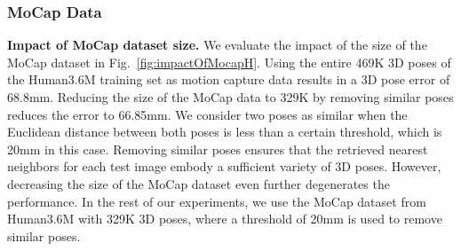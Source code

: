 \documentclass[10pt,journal,compsoc]{IEEEtran}
\begin{document}
\subsubsection*{MoCap Data}\label{sec:mocap_data}

\textbf{Impact of MoCap dataset size.}
We evaluate the impact of the size of the MoCap dataset in Fig.~\ref{fig:impactOfMocapH}. Using the entire 469K 3D poses of the 
Human3.6M training set as motion capture data results in a 3D pose error of 68.8mm. Reducing the size of the MoCap data to 329K by
removing similar poses reduces the error to 66.85mm. We consider two poses as similar when the Euclidean distance between 
both poses is less than a certain threshold, which is 20mm in this case. Removing similar poses ensures that the retrieved nearest neighbors for each
test image embody a sufficient variety of 3D poses. However, decreasing the size of the MoCap dataset even further 
degenerates the performance. In the rest of our experiments, we use the MoCap dataset from Human3.6M with 329K 3D poses, 
where a threshold of 20mm is used to remove similar poses.\\
\end{document}
